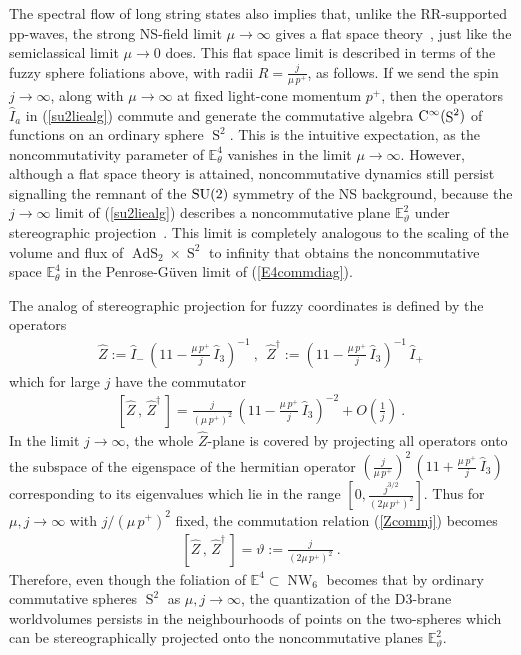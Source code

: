 \documentclass[11pt,a4paper]{article}
\DeclareMathOperator{\AdS}{AdS}
\DeclareMathOperator{\Sphere}{S}
\DeclareMathOperator{\NW}{NW}
\let\S\Sphere
\newcommand{\eucl}{{\mathbb E}}
\newcommand{\id}{{1\!\!1}} %
\newcommand{\beq}{\begin{eqnarray}}
\newcommand{\eeq}{\end{eqnarray}}
\begin{document}
The spectral flow of long string states also implies that, unlike the
RR-supported pp-waves, the strong NS-field limit $\mu\to\infty$ gives a flat
space theory~\cite{DAK1}, just like the semiclassical limit $\mu\to0$
does. This flat space limit is described in terms of the fuzzy sphere
foliations above, with radii $R=\frac j{\mu\,p^+}$, as follows. If we
send the spin $j\to\infty$, along with $\mu\to\infty$ at fixed
light-cone momentum $p^+$, then the operators $\hat I_a$ in
(\ref{su2liealg}) commute and generate the commutative algebra ${\rm
  C}^\infty(\S^2)$ of functions on an ordinary sphere $\S^2$. This is
the intuitive expectation, as the noncommutativity parameter of
$\eucl_\theta^4$ vanishes in the limit $\mu\to\infty$. However,
although a flat space theory is attained, noncommutative dynamics
still persist signalling the remnant of the ${\rm SU}(2)$ symmetry of
the NS background, because the $j\to\infty$ limit of (\ref{su2liealg})
describes a noncommutative plane $\eucl_\vartheta^2$ under
stereographic projection~\cite{APS1,CMS1}. This limit is completely
analogous to the scaling of the volume and flux of $\AdS_2\times\S^2$ to
infinity that obtains the noncommutative space $\eucl_\theta^4$ in the
Penrose-G\"uven limit of (\ref{E4commdiag}).

The analog of stereographic projection for fuzzy coordinates is
defined by the operators~\cite{APS1,CMS1}
\beq
\hat Z:=\hat I_-\,\left(\id-\mbox{$\frac{\mu\,p^+}j$}\,\hat I_3
\right)^{-1} \ , ~~ \hat Z^\dag:=\left(\id-\mbox{$\frac{\mu\,p^+}j$}\,
\hat I_3\right)^{-1}\,\hat I_+
\label{fuzzystereo}\eeq
which for large $j$ have the commutator
\beq
\left[\hat Z\,,\,\hat Z^\dag\,\right]=\mbox{$\frac j{\left(\mu\,p^+
\right)^2}$}\,\left(\id-\mbox{$\frac{\mu\,p^+}j$}\,\hat I_3
\right)^{-2}+O\left(\mbox{$\frac1j$}\right) \ .
\label{Zcommj}\eeq
In the limit $j\to\infty$, the whole $\hat Z$-plane is covered by
projecting all operators onto the subspace of the eigenspace of the
hermitian operator $(\frac j{\mu\,p^+})^2\,(\id+\frac{\mu\,p^+}j\,\hat
I_3)$ corresponding to its eigenvalues which lie in the range
$[0,\frac{j^{3/2}}{(2\mu\,p^+)^2}]$. Thus for $\mu,j\to\infty$ with
$j/(\mu\,p^+)^2$ fixed, the commutation relation (\ref{Zcommj})
becomes
\beq
\left[\hat Z\,,\,\hat Z^\dag\,\right]=\vartheta:=
\mbox{$\frac j{\left(2\mu\,p^+\right)^2}$} \ .
\label{Zcommtheta}\eeq
Therefore, even though the foliation of $\eucl^4\subset\NW_6$ becomes
that by ordinary commutative spheres $\S^2$ as $\mu,j\to\infty$, the
quantization of the D3-brane worldvolumes persists in the
neighbourhoods of points on the two-spheres which can be
stereographically projected onto the noncommutative planes
$\eucl_\vartheta^2$.
\end{document}
